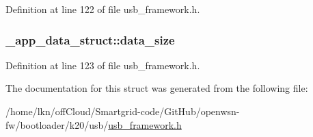 Definition at line 122 of file usb\+\_\+framework.\+h.

\subsubsection[{\texorpdfstring{data\+\_\+size}{data_size}}]{ \+\_\+app\+\_\+data\+\_\+struct\+::data\+\_\+size}\hypertarget{struct__app__data__struct_abc0190eb1ad295290935d9967e73c71f}{}\label{struct__app__data__struct_abc0190eb1ad295290935d9967e73c71f}


Definition at line 123 of file usb\+\_\+framework.\+h.



The documentation for this struct was generated from the following file\+:\begin{DoxyCompactItemize}
\item 
/home/lkn/off\+Cloud/\+Smartgrid-\/code/\+Git\+Hub/openwsn-\/fw/bootloader/k20/usb/\hyperlink{usb__framework_8h}{usb\+\_\+framework.\+h}\end{DoxyCompactItemize}
